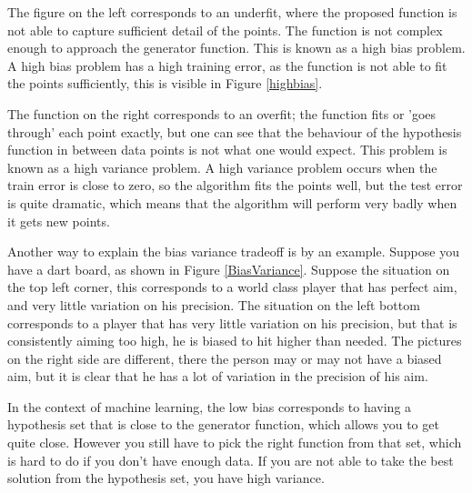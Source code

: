\npar

The figure on the left corresponds to an underfit, where the proposed function is not able to capture sufficient detail of the points. The function is not complex enough to approach the generator function. This is known as a high bias problem. A high bias problem has a high training error, as the function is not able to fit the points sufficiently, this is visible in Figure \ref{highbias}.


The function on the right corresponds to an overfit; the function fits or 'goes through' each point exactly, but one can see that the behaviour of the hypothesis function in between data points is not what one would expect. This problem is known as a high variance problem. A high variance problem occurs when the train error is close to zero, so the algorithm fits the points well, but the test error is quite dramatic, which means that the algorithm will perform very badly when it gets new points. 


Another way to explain the bias variance tradeoff is by an example. Suppose you have a dart board, as shown in Figure \ref{BiasVariance}. Suppose the situation on the top left corner, this corresponds to a world class player that has perfect aim, and very little variation on his precision. The situation on the left bottom corresponds to a player that has very little variation on his precision, but that is consistently aiming too high, he is biased to hit higher than needed. The pictures on the right side are different, there the person may or may not have a biased aim, but it is clear that he has a lot of variation in the precision of his aim.

\npar

In the context of machine learning, the low bias corresponds to having a hypothesis set that is close to the generator function, which allows you to get quite close. However you still have to pick the right function from that set, which is hard to do if you don't have enough data. If you are not able to take the best solution from the hypothesis set, you have high variance.



